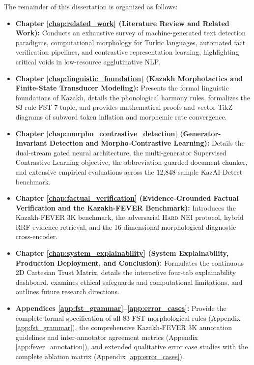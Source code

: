 The remainder of this dissertation is organized as follows:
\begin{itemize}
    \item \textbf{Chapter \ref{chap:related_work} (Literature Review and Related Work):} Conducts an exhaustive survey of machine-generated text detection paradigms, computational morphology for Turkic languages, automated fact verification pipelines, and contrastive representation learning, highlighting critical voids in low-resource agglutinative NLP.
    \item \textbf{Chapter \ref{chap:linguistic_foundation} (Kazakh Morphotactics and Finite-State Transducer Modeling):} Presents the formal linguistic foundations of Kazakh, details the phonological harmony rules, formalizes the 83-rule FST 7-tuple, and provides mathematical proofs and vector TikZ diagrams of subword token inflation and morphemic rate convergence.
    \item \textbf{Chapter \ref{chap:morpho_contrastive_detection} (Generator-Invariant Detection and Morpho-Contrastive Learning):} Details the dual-stream gated neural architecture, the multi-generator Supervised Contrastive Learning objective, the abbreviation-guarded document chunker, and extensive empirical evaluations across the 12,848-sample KazAI-Detect benchmark.
    \item \textbf{Chapter \ref{chap:factual_verification} (Evidence-Grounded Factual Verification and the Kazakh-FEVER Benchmark):} Introduces the Kazakh-FEVER 3K benchmark, the adversarial \textsc{Hard NEI} protocol, hybrid RRF evidence retrieval, and the 16-dimensional morphological diagnostic cross-encoder.
    \item \textbf{Chapter \ref{chap:system_explainability} (System Explainability, Production Deployment, and Conclusion):} Formulates the continuous 2D Cartesian Trust Matrix, details the interactive four-tab explainability dashboard, examines ethical safeguards and computational limitations, and outlines future research directions.
    \item \textbf{Appendices \ref{app:fst_grammar}--\ref{app:error_cases}:} Provide the complete formal specification of all 83 FST morphological rules (Appendix \ref{app:fst_grammar}), the comprehensive Kazakh-FEVER 3K annotation guidelines and inter-annotator agreement metrics (Appendix \ref{app:fever_annotation}), and extended qualitative error case studies with the complete ablation matrix (Appendix \ref{app:error_cases}).
\end{itemize}
